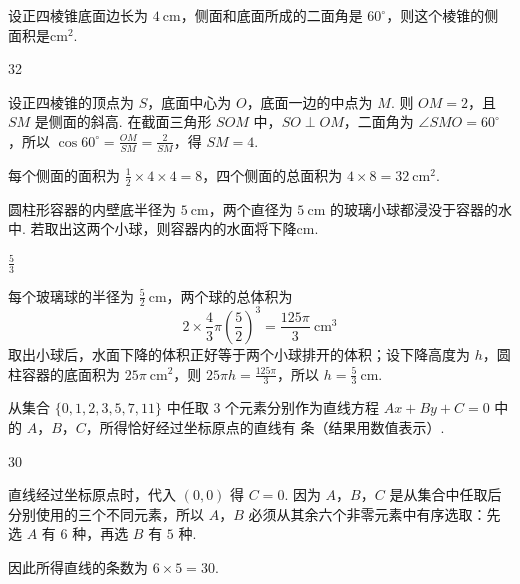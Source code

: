 \begin{problem}[A]
设正四棱锥底面边长为 \(4\mathrm{~cm}\)，侧面和底面所成的二面角是 \(60^\circ\)，则这个棱锥的侧面积是\fillinblank{}\(\mathrm{cm}^2\).
\end{problem}

\begin{answer}
32
\end{answer}

\begin{solution}
设正四棱锥的顶点为 \(S\)，底面中心为 \(O\)，底面一边的中点为 \(M\). 则 \(OM=2\)，且 \(SM\) 是侧面的斜高. 在截面三角形 \(SOM\) 中，\(SO\perp OM\)，二面角为 \(\angle SMO=60^\circ\)，所以
\(\cos60^\circ=\frac{OM}{SM}=\frac{2}{SM}\)，得 \(SM=4\).

每个侧面的面积为 \(\frac12\times4\times4=8\)，四个侧面的总面积为 \(4\times8=32\ \mathrm{cm}^2\).
\end{solution}

\begin{problem}[A]
圆柱形容器的内壁底半径为 \(5\mathrm{~cm}\)，两个直径为 \(5\mathrm{~cm}\) 的玻璃小球都浸没于容器的水中. 若取出这两个小球，则容器内的水面将下降\fillinblank{}\(\mathrm{cm}\).
\end{problem}

\begin{answer}
\(\frac{5}{3}\)
\end{answer}

\begin{solution}
每个玻璃球的半径为 \(\frac52\ \mathrm{cm}\)，两个球的总体积为
\[
2\times\frac43\pi\left(\frac52\right)^3=\frac{125\pi}{3}\ \mathrm{cm}^3
\]
取出小球后，水面下降的体积正好等于两个小球排开的体积；设下降高度为 \(h\)，圆柱容器的底面积为 \(25\pi\ \mathrm{cm}^2\)，则
\(25\pi h=\frac{125\pi}{3}\)，所以 \(h=\frac53\ \mathrm{cm}\).
\end{solution}

\begin{problem}[A]
从集合 \(\{0,1,2,3,5,7,11\}\) 中任取 \(3\) 个元素分别作为直线方程 \(Ax+By+C=0\) 中的 \(A\)，\(B\)，\(C\)，所得恰好经过坐标原点的直线有\fillinblank{} 条（结果用数值表示）.
\end{problem}

\begin{answer}
30
\end{answer}

\begin{solution}
直线经过坐标原点时，代入 \((0,0)\) 得 \(C=0\). 因为 \(A\)，\(B\)，\(C\) 是从集合中任取后分别使用的三个不同元素，所以 \(A\)，\(B\) 必须从其余六个非零元素中有序选取：先选 \(A\) 有 \(6\) 种，再选 \(B\) 有 \(5\) 种.

因此所得直线的条数为 \(6\times5=30\).
\end{solution}

